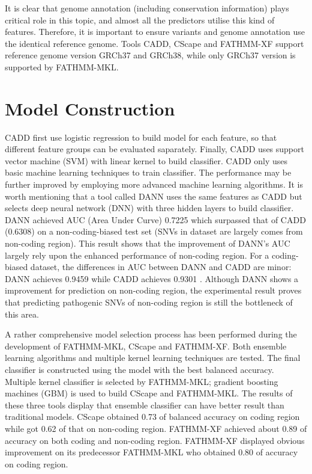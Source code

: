 \documentclass[a4paper,nohyper,nobib,openany,justified]{tufte-book}
\begin{document}
\begin{fullwidth}
It is clear that genome annotation (including conservation information) plays critical role in this topic, and almost all the predictors utilise this kind of features. Therefore, it is important to ensure variants and genome annotation use the identical reference genome. Tools CADD, CScape and FATHMM-XF support reference genome version GRCh37 and GRCh38, while only GRCh37 version is supported by FATHMM-MKL.

\section{Model Construction}

CADD first use logistic regression to build model for each feature, so that different feature groups can be evaluated saparately. Finally, CADD uses support vector machine (SVM) with linear kernel to build classifier. CADD only uses basic machine learning techniques to train classifier. The performance may be further improved by employing more advanced machine learning algorithms. It is worth mentioning that a tool called DANN \cite{Quang2015} uses the same features as CADD but selects deep neural network (DNN) with three hidden layers to build classifier. DANN achieved AUC (Area Under Curve) 0.7225 which surpassed that of CADD (0.6308) on a non-coding-biased test set (SNVs in dataset are largely comes from non-coding region)\cite{Quang2015}. This result shows that the improvement of DANN's AUC largely rely upon the enhanced performance of non-coding region. For a coding-biased dataset, the differences in AUC between DANN and CADD are minor: DANN achieves 0.9459 while CADD achieves 0.9301 \cite{Quang2015}. Although DANN shows a improvement for prediction on non-coding region, the experimental result proves that predicting pathogenic SNVs of non-coding region is still the bottleneck of this area.

A rather comprehensive model selection process has been performed during the development of FATHMM-MKL, CScape and FATHMM-XF. Both ensemble learning algorithms and multiple kernel learning techniques are tested. The final classifier is constructed using the model with the best balanced accuracy. Multiple kernel classifier is selected by FATHMM-MKL; gradient boosting machines (GBM) is used to build CScape and FATHMM-MKL. The results of these three tools display that ensemble classifier can have better result than traditional models. CScape obtained 0.73 of balanced accuracy on coding region while got 0.62 of that on non-coding region. FATHMM-XF achieved about 0.89 of accuracy on both coding and non-coding region. FATHMM-XF displayed obvious improvement on its predecessor FATHMM-MKL who obtained 0.80 of accuracy on coding region.


\end{fullwidth}
\end{document}
